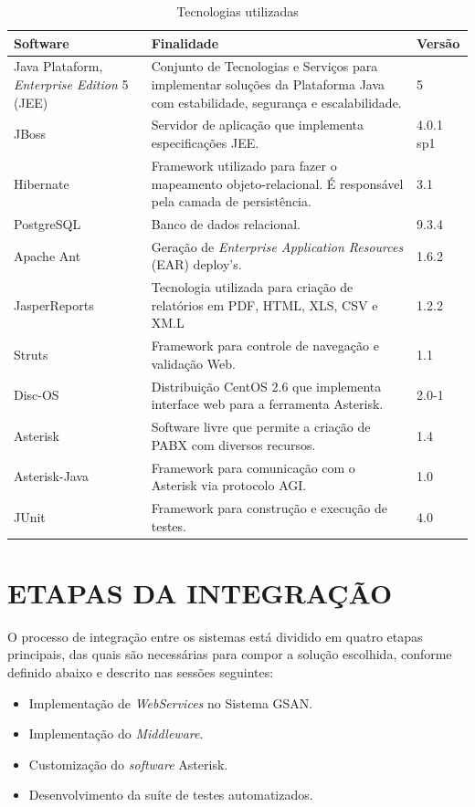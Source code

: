 \begin{table}[H]
	\center
	\footnotesize
	\caption{Tecnologias utilizadas}
	\label{tabela:tecnologiasUtilizadas}
	\begin{tabular}{|p{4cm}|p{7cm}|p{2cm}|}
		\hline
		\textbf{Software} & \textbf{Finalidade} & \textbf{Versão} \\
		\hline
		Java Plataform, \textit{Enterprise Edition} 5 (JEE) & Conjunto de Tecnologias e Serviços para implementar soluções da Plataforma Java com estabilidade, segurança e escalabilidade. & 5 \\
		\hline
		JBoss 				& Servidor de aplicação que implementa especificações JEE. 								& 4.0.1 sp1 \\
		\hline
		Hibernate 			& Framework utilizado para fazer o mapeamento objeto-relacional. É responsável pela camada de persistência. & 3.1 \\
		\hline
		PostgreSQL 			& Banco de dados relacional. 															& 9.3.4 \\
		\hline
		Apache Ant 			& Geração de \textit{Enterprise Application Resources} (EAR) deploy’s. 					& 1.6.2 \\
		\hline
		JasperReports 		& Tecnologia utilizada para criação de relatórios em PDF, HTML, XLS, CSV e XM.L 		& 1.2.2 \\
		\hline
		Struts 				& Framework para controle de navegação e validação Web. 								& 1.1	 \\
		\hline
		Disc-OS 			& Distribuição CentOS 2.6 que implementa interface web para a ferramenta Asterisk. 		& 2.0-1 \\
		\hline
		Asterisk 			& Software livre que permite a criação de PABX com diversos recursos. 					& 1.4 \\		
		\hline
		Asterisk-Java 		& Framework para comunicação com o Asterisk via protocolo AGI. 							& 1.0 \\
		\hline
		JUnit		 		& Framework para construção e execução de testes. 										& 4.0 \\		
		\hline			
	\end{tabular}
\end{table}



\section{\textbf{\uppercase{Etapas da Integração}}}
O processo de integração entre os sistemas está dividido em quatro etapas principais, das quais são necessárias para compor a solução escolhida, conforme definido abaixo e descrito nas sessões seguintes:

\begin{itemize}
	\item Implementação de \textit{WebServices} no Sistema GSAN. 
	\item Implementação do \textit{Middleware}.
	\item Customização do \textit{software} Asterisk.
	\item Desenvolvimento da suíte de testes automatizados.
\end{itemize}
